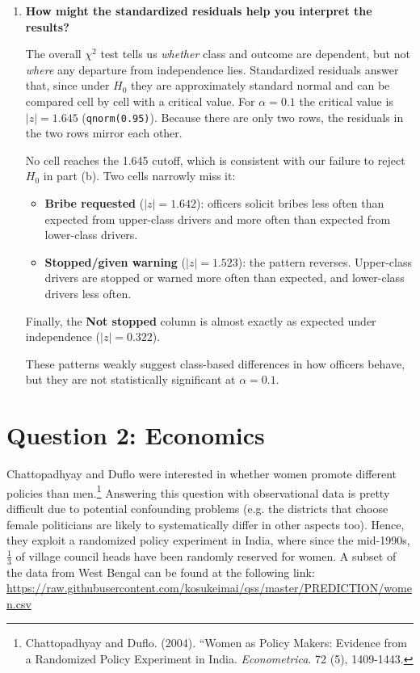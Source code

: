 \documentclass[12pt,letterpaper]{article}
\begin{document}
\begin{enumerate}
\begin{table}[h]
\begin{tabular}{l | c c c }
		\end{tabular}
	\end{table}
	
	\vspace{1cm}
	\item [(d)] \textbf{How might the standardized residuals help you interpret the results?}  
		\vspace{0.5cm}
	
	\noindent The overall $\chi^2$ test tells us \emph{whether} class and outcome are dependent, but not \emph{where} any departure from independence lies. Standardized residuals answer that, since under $H_0$ they are approximately standard normal and can be compared cell by cell with a critical value. For $\alpha = 0.1$ the critical value is $|z| = 1.645$ (\texttt{qnorm(0.95)}). Because there are only two rows, the residuals in the two rows mirror each other.
	
	No cell reaches the 1.645 cutoff, which is consistent with our failure to reject $H_0$ in part (b). Two cells narrowly miss it:
	\begin{itemize}
		\item \textbf{Bribe requested} ($|z| = 1.642$): officers solicit bribes less often than expected from upper-class drivers and more often than expected from lower-class drivers.
		\item \textbf{Stopped/given warning} ($|z| = 1.523$): the pattern reverses. Upper-class drivers are stopped or warned more often than expected, and lower-class drivers less often.
	\end{itemize}
	
	Finally, the \textbf{Not stopped} column is almost exactly as expected under independence ($|z| = 0.322$).
	
	These patterns weakly suggest class-based differences in how officers behave, but they are not statistically significant at $\alpha = 0.1$. 
	
\end{enumerate}
\newpage

\section*{Question 2: Economics}
Chattopadhyay and Duflo were interested in whether women promote different policies than men.\footnote{Chattopadhyay and Duflo. (2004). ``Women as Policy Makers: Evidence from a Randomized Policy Experiment in India. \textit{Econometrica}. 72 (5), 1409-1443.} Answering this question with observational data is pretty difficult due to potential confounding problems (e.g. the districts that choose female politicians are likely to systematically differ in other aspects too). Hence, they exploit a randomized policy experiment in India, where since the mid-1990s, $\frac{1}{3}$ of village council heads have been randomly reserved for women. A subset of the data from West Bengal can be found at the following link: \url{https://raw.githubusercontent.com/kosukeimai/qss/master/PREDICTION/women.csv}\\
\end{document}

